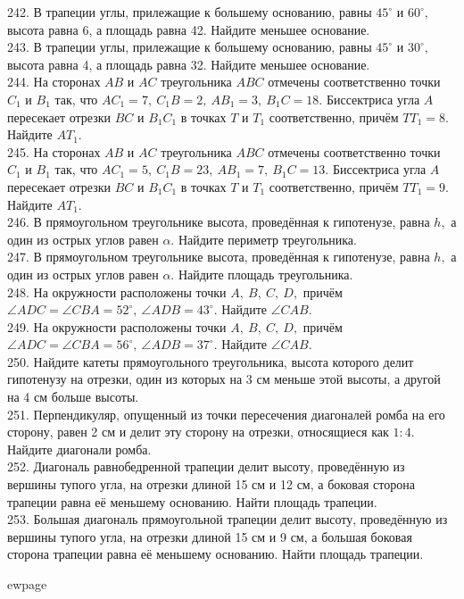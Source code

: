 242. В трапеции углы, прилежащие к большему основанию, равны $45^\circ$ и $60^\circ,$ высота равна 6, а площадь равна 42. Найдите меньшее основание.\\
243. В трапеции углы, прилежащие к большему основанию, равны $45^\circ$ и $30^\circ,$ высота равна 4, а площадь равна 32. Найдите меньшее основание.\\
244. На сторонах $AB$ и $AC$ треугольника $ABC$ отмечены соответственно точки $C_1$ и $B_1$ так, что $AC_1=7,\
C_1B=2,\ AB_1=3,\ B_1C=18.$ Биссектриса угла $A$ пересекает отрезки $BC$ и $B_1C_1$ в точках $T$ и $T_1$ соответственно, причём
$TT_1=8.$ Найдите $AT_1.$\\
245. На сторонах $AB$ и $AC$ треугольника $ABC$ отмечены соответственно точки $C_1$ и $B_1$ так, что $AC_1=5,\
C_1B=23,\ AB_1=7,\ B_1C=13.$ Биссектриса угла $A$ пересекает отрезки $BC$ и $B_1C_1$ в точках $T$ и $T_1$ соответственно, причём
$TT_1=9.$ Найдите $AT_1.$\\
246. В прямоугольном треугольнике высота, проведённая к гипотенузе, равна $h,$ а один из острых
углов равен $\alpha.$ Найдите периметр треугольника.\\
247. В прямоугольном треугольнике высота, проведённая к гипотенузе, равна $h,$ а один из острых
углов равен $\alpha.$ Найдите площадь треугольника.\\
248. На окружности расположены точки $A,\ B,\ C,\ D,$ причём $\angle ADC=\angle CBA=52^\circ,\
\angle ADB=43^\circ.$ Найдите $\angle CAB.$\\
249. На окружности расположены точки $A,\ B,\ C,\ D,$ причём $\angle ADC=\angle CBA=56^\circ,\
\angle ADB=37^\circ.$ Найдите $\angle CAB.$\\
250. Найдите катеты прямоугольного треугольника, высота
которого делит гипотенузу на отрезки, один из которых
на 3 см меньше этой высоты, а другой на 4 см больше
высоты.\\
251. Перпендикуляр, опущенный из точки пересечения
диагоналей ромба на его сторону, равен 2 см и делит эту
сторону на отрезки, относящиеся как $1:4.$ Найдите
диагонали ромба.\\
252. Диагональ равнобедренной трапеции делит высоту,
проведённую из вершины тупого угла, на отрезки длиной
15 см и 12 см, а боковая сторона трапеции равна её
меньшему основанию. Найти площадь трапеции.\\
253. Большая диагональ прямоугольной трапеции делит
высоту, проведённую из вершины тупого угла, на отрезки
длиной 15 см и 9 см, а большая боковая сторона трапеции
равна её меньшему основанию. Найти площадь
трапеции.

ewpage
